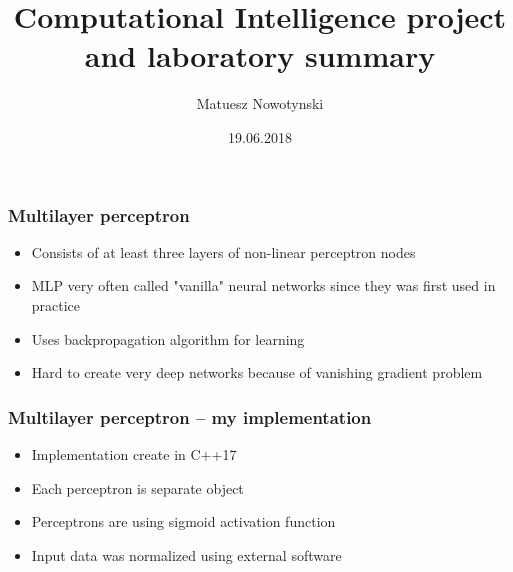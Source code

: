 \documentclass{beamer}
\title{Computational Intelligence project and laboratory summary}
\author[M. Nowotynski]{Matuesz Nowotynski}%
\date[2018]{19.06.2018}
\institute[AGH]
{Faculty of EAIiIB\\ 
Department of Applied Computer Science
}
\begin{document}
{
 \begin{frame}
   \titlepage
 \end{frame}
}



\begin{frame}
\frametitle{Multilayer perceptron}

\begin{itemize}
	\item Consists of at least three layers of non-linear perceptron nodes
	\item MLP very often called "vanilla" neural networks since they was first used in practice
	\item Uses backpropagation algorithm for learning
	\item Hard to create very deep networks because of vanishing gradient problem
\end{itemize}

\end{frame}

\begin{frame}
\frametitle{Multilayer perceptron -- my implementation}

\begin{itemize}
	\item Implementation create in C++17
	\item Each perceptron is separate object
	\item Perceptrons are using sigmoid activation function
	\item Input data was normalized using external software
\end{itemize}

\end{frame}
\end{document}
